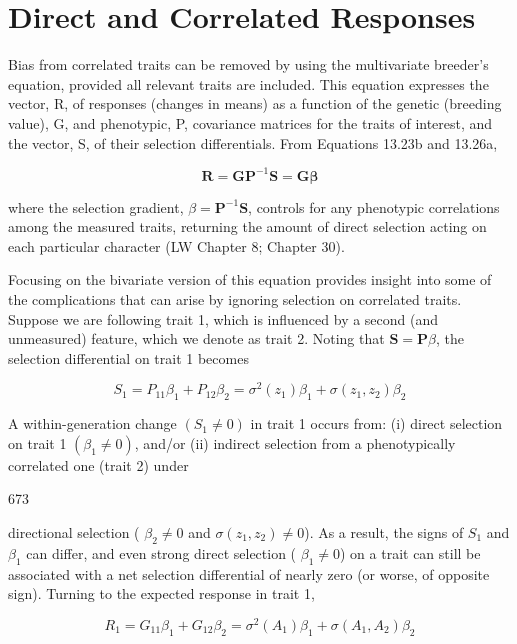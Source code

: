 \documentclass{article}
\begin{document}
\section{Direct and Correlated Responses}
Bias from correlated traits can be removed by using the multivariate breeder's equation, provided all relevant traits are included. This equation expresses the vector, R, of responses (changes in means) as a function of the genetic (breeding value), G, and phenotypic, P, covariance matrices for the traits of interest, and the vector, S, of their selection differentials. From Equations 13.23b and 13.26a,

\begin{equation}
\mathbf{R}=\mathbf{G}\mathbf{P}^{-1}\mathbf{S}=\mathbf{G}\boldsymbol{\beta}
\end{equation}

where the selection gradient,  $ \beta = \mathbf{P}^{-1}\mathbf{S} $, controls for any phenotypic correlations among the measured traits, returning the amount of direct selection acting on each particular character (LW Chapter 8; Chapter 30).

Focusing on the bivariate version of this equation provides insight into some of the complications that can arise by ignoring selection on correlated traits. Suppose we are following trait 1, which is influenced by a second (and unmeasured) feature, which we denote as trait 2. Noting that  $ \mathbf{S} = \mathbf{P}\beta $, the selection differential on trait 1 becomes

\begin{equation}
S_{1}=P_{11}\beta_{1}+P_{12}\beta_{2}=\sigma^{2}(z_{1})\beta_{1}+\sigma(z_{1},z_{2})\beta_{2}
\tag{20.1a}
\label{eq:20_1a}
\end{equation}

A within-generation change  $ (S_1 \neq 0) $ in trait 1 occurs from: (i) direct selection on trait 1  $ (\beta_1 \neq 0) $, and/or (ii) indirect selection from a phenotypically correlated one (trait 2) under

673

directional selection ( $ \beta_2 \neq 0 $ and  $ \sigma(z_1, z_2) \neq 0 $). As a result, the signs of  $ S_1 $ and  $ \beta_1 $ can differ, and even strong direct selection ( $ \beta_1 \neq 0 $) on a trait can still be associated with a net selection differential of nearly zero (or worse, of opposite sign). Turning to the expected response in trait 1,

\begin{equation}
R_{1}=G_{11}\beta_{1}+G_{12}\beta_{2}=\sigma^{2}(A_{1})\beta_{1}+\sigma(A_{1},A_{2})\beta_{2}
\tag{20.1b}
\label{eq:20_1b}
\end{equation}
\end{document}

